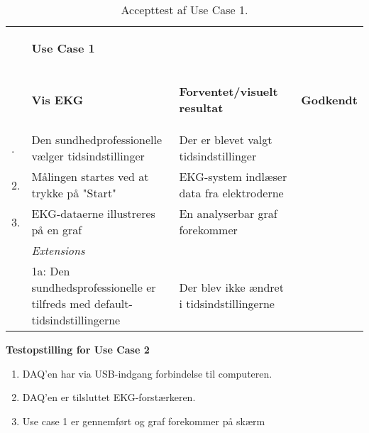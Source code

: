 \begin{table}[H]
    \begin{tabularx}{\textwidth}{l X X c}
     \toprule
     ~ & \begin{large}\textbf{Use Case 1} \end{large} & ~ & ~ \\  
     ~ & \begin{large}\textbf{Vis EKG} \end{large}	  
     & \begin{large} \textbf{Forventet/visuelt resultat}\end{large} 
     & \begin{large} \textbf{Godkendt} \end{large}      
     \\     	 \midrule \addlinespace[3mm]                                                                                                                                                                             					    
                         1. &  Den sundhedprofessionelle vælger tidsindstillinger
     					    &  Der er blevet valgt tidsindstillinger 
     					    &  %
     					    \\ \midrule  
     					 2. &  Målingen startes ved at trykke på "Start"
     					    &  EKG-system indlæser data fra elektroderne
     					    &  %
     					    \\ \midrule
     					 3. &  EKG-dataerne illustreres på en graf 
     					    &  En analyserbar graf forekommer
     					    &  %
     					    \\ \midrule   
                         ~  &  \textit{Extensions}
     					    &  ~  
     					    &  ~         \\	\midrule
                         ~  &  1a: Den sundhedsprofessionelle er tilfreds med default-tidsindstillingerne
     					    &  Der blev ikke ændret i tidsindstillingerne 
     					    &  %
     					    \\
    					         					         	
	\bottomrule   
    \end{tabularx}
    \caption {Accepttest af Use Case 1.}
    \label{tab:AT_UC1}
\end{table}


\textbf{Testopstilling for Use Case 2}
\begin{enumerate}
	\item DAQ’en har via USB-indgang forbindelse til computeren.
	\item DAQ’en er tilsluttet EKG-forstærkeren.
	\item Use case 1 er gennemført og graf forekommer på skærm
\end{enumerate}

